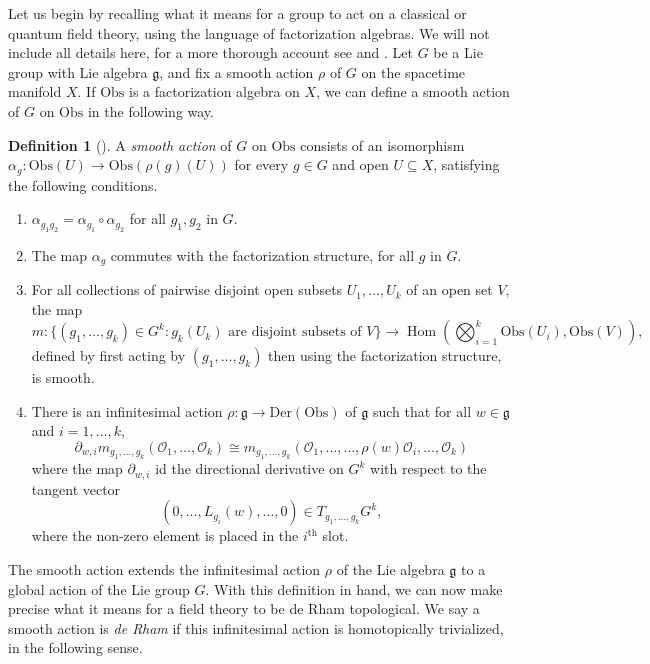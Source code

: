 \documentclass[11pt, oneside, reqno]{amsart}
\theoremstyle{definition} \newtheorem{definition}{Definition}[section]
\theoremstyle{definition}
\theoremstyle{remark}
\theoremstyle{definition} \newtheorem{remark}[definition]{Remark}
\theoremstyle{definition} \newtheorem{remarks}[definition]{Remarks}
\theoremstyle{definition} \newtheorem{question}[definition]{Question}
\theoremstyle{definition} \newtheorem*{note}{Note}
\theoremstyle{definition} \newtheorem{example}[definition]{Example}
\theoremstyle{definition} \newtheorem{examples}[definition]{Examples}
\newcommand{\dd}{\partial}
\renewcommand{\gg}{\mathfrak{g}}
\newcommand{\iso}{\cong}
\newcommand{\sub}{\subseteq}
\newcommand{\mr}[1]{\mathrm{#1}}
\newcommand{\mc}[1]{\mathcal{#1}}
\renewcommand{\hom}{\operatorname{Hom}}
\newcommand{\obs}{\mathrm{Obs}}
\begin{document}
Let us begin by recalling what it means for a group to act on a classical or quantum field theory, using the language of factorization algebras.  We will not include all details here, for a more thorough account see \cite[Chapter 4.8]{Book2} and \cite[Section 2]{ElliottSafronov}.  Let $G$ be a Lie group with Lie algebra $\gg$, and fix a smooth action $\rho$ of $G$ on the spacetime manifold $X$.  If $\obs$ is a factorization algebra on $X$, we can define a smooth action of $G$ on $\obs$ in the following way.

\begin{definition}[{\cite[Definition 2.11]{ElliottSafronov}}]
A \emph{smooth action} of $G$ on $\obs$ consists of an isomorphism $\alpha_g \colon \obs(U) \to \obs(\rho(g)(U))$ for every $g \in G$ and open $U \sub X$, satisfying the following conditions.
\begin{enumerate}
 \item $\alpha_{g_1g_2} = \alpha_{g_1} \circ \alpha_{g_2}$ for all $g_1, g_2$ in $G$.
 \item The map $\alpha_g$ commutes with the factorization structure, for all $g$ in $G$.
 \item For all collections of pairwise disjoint open subsets $U_1, \ldots, U_k$ of an open set $V$, the map
 \[m \colon \{(g_1, \ldots, g_k) \in G^k \colon g_k(U_k) \text{ are disjoint subsets of } V\} \to \hom\left(\bigotimes_{i=1}^k \obs(U_i), \obs(V)\right),\]
 defined by first acting by $(g_1, \ldots, g_k)$ then using the factorization structure, is smooth.
 \item There is an infinitesimal action $\rho \colon \gg \to \mr{Der}(\obs)$ of $\gg$ such that for all $w \in \gg$ and $i = 1, \ldots, k$,
 \[\dd_{w,i}m_{g_1, \ldots, g_k}(\mc{O}_1, \ldots, \mc{O}_k) \iso m_{g_1, \ldots, g_k}(\mc{O}_1, \ldots, \ldots, \rho(w)\mc{O}_i, \ldots, \mc{O}_k)\]
 where the map $\dd_{w,i}$ id the directional derivative on $G^k$ with respect to the tangent vector
 \[(0, \ldots, L_{g_i}(w), \ldots, 0) \in T_{g_1, \ldots, g_k}G^k,\]
 where the non-zero element is placed in the $i^{\mr{th}}$ slot.
\end{enumerate}
\end{definition}

The smooth action extends the infinitesimal action $\rho$ of the Lie algebra $\gg$ to a global action of the Lie group $G$.  With this definition in hand, we can now make precise what it means for a field theory to be de Rham topological.  We say a smooth action is \emph{de Rham} if this infinitesimal action is homotopically trivialized, in the following sense.
\end{document}

